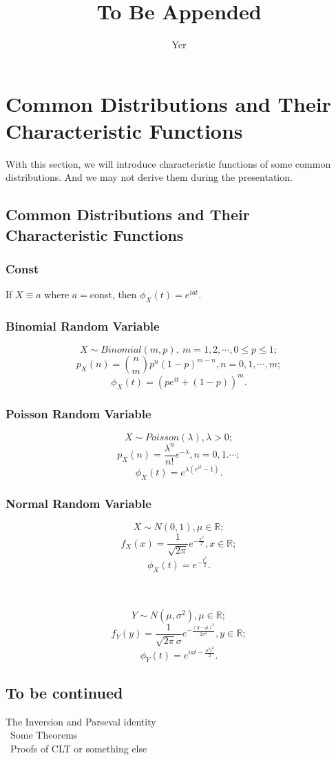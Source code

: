\documentclass[lnbip]{svmultln}
\begin{document}
%
\mainmatter              %
%
\title{To Be Appended}

\author{Ycr}

\maketitle              %

\section{Common Distributions and Their Characteristic Functions}
With this section, we will introduce characteristic functions of some common distributions. And we may not derive them during the presentation.

\subsection{Common Distributions and Their Characteristic Functions}
\subsubsection{Const}

%
If $X\equiv a$ where $a= $const, then $\phi_X(t) = e^{iat}.$
%
\subsubsection{Binomial Random Variable}
%
$$X\sim Binomial(m,p),\ m=1,2,\cdots, 0\leq p \leq 1;$$
$$p_X(n) = \binom{n}{m} p^n(1-p)^{m-n}, n = 0,1,\cdots,m;$$
$$\phi_X(t) = (pe^{it} + (1-p))^m.$$

\subsubsection{Poisson Random Variable}
%
$$X\sim Poisson(\lambda),\lambda>0;$$
$$p_X(n) = \frac{\lambda ^n}{n!} e^{-\lambda}, n = 0,1.\cdots;$$
$$\phi_X(t)=e^{\lambda(e^{it}-1)}.$$

\subsubsection{Normal Random Variable}
$$X\sim N(0,1), \mu \in \mathbb{R};$$
$$f_X(x) = \frac{1}{\sqrt{2\pi}}e^{-\frac{x^2}{2}}, x\in \mathbb{R};$$
$$\phi_X(t)=e^{-\frac{t^2}{2}}.$$

\\\
$$Y\sim N(\mu,\sigma ^2), \mu \in \mathbb{R};$$
$$f_Y(y) = \frac{1}{\sqrt{2\pi}\sigma}e^{-\frac{(y-\mu)^2}{2\sigma ^2}}, y\in \mathbb{R};$$
$$\phi_Y(t)=e^{iat-\frac{\sigma^2 t^2}{2}}.$$
%
\subsection{To be continued}
The Inversion and Parseval identity\\\
Some Theorems\\\
Proofs of CLT or something else\\\

%
%
\begin{thebibliography}{1}



\end{thebibliography}
%
\end{document}
